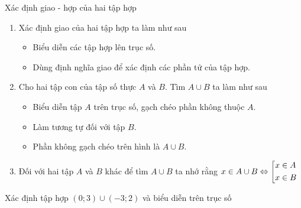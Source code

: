 \begin{dang}{Xác định giao - hợp của hai tập hợp}
\begin{enumerate}
\item Xác định giao của hai tập hợp ta làm như sau
\begin{itemize}
\item Biểu diễn các tập hợp lên trục số.
\item Dùng định nghĩa giao để xác định các phần tử của tập hợp.
\end{itemize}
\item Cho hai tập con của tập số thực $A$ và $B$. Tìm $A\cup B$ ta làm như sau
\begin{itemize}
\item Biểu diễn tập $A$ trên trục số, gạch chéo phần không thuộc $A$.
\item Làm tương tự đối với tập $B$.
\item Phần không gạch chéo trên hình là $A\cup B$.
\end{itemize}
\item Đối với hai tập $A$ và $B$ khác để tìm $A\cup B$ ta nhớ rằng $x\in A\cup B\Leftrightarrow\left[\begin{aligned}& x\in A\\& x\in B\end{aligned}\right.$ 
\end{enumerate}
\end{dang}


\begin{vd}%
Xác định tập hợp $(0;3)\cup (-3;2)$ và biểu diễn trên trục số
\end{vd}

